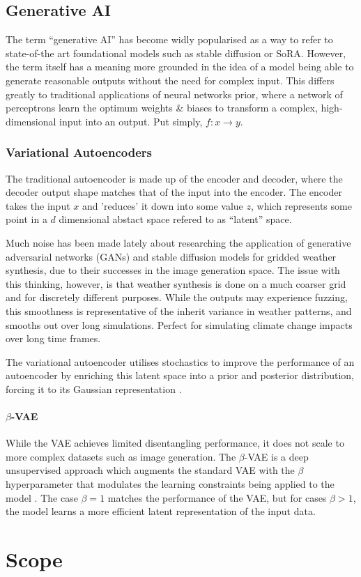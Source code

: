 \section{Generative AI}

The term ``generative AI'' has become widly popularised as a way to refer to state-of-the art 
foundational models such as stable diffusion or SoRA. However, the term itself has a meaning
more grounded in the idea of a model being able to generate reasonable outputs without the
need for complex input. This differs greatly to traditional applications of neural networks
prior, where a network of perceptrons learn the optimum weights \& biases to transform a 
complex, high-dimensional input into an output. Put simply, $f: x \rightarrow y$.

\subsection{Variational Autoencoders}

The traditional autoencoder is made up of the encoder and decoder, where the decoder output 
shape matches that of the input into the encoder. The encoder takes the input $x$ and 'reduces'
it down into some value $z$, which represents some point in a $d$ dimensional abstact space
refered to as ``latent'' space.

Much noise has been made lately about researching the application of generative adversarial
networks (GANs) and stable diffusion models for gridded weather synthesis, due to their 
successes in the image generation space. The issue with this thinking, however, is that 
weather synthesis is done on a much coarser grid and for discretely different purposes.
While the outputs may experience fuzzing, this smoothness is representative of the inherit
variance in weather patterns, and smooths out over long simulations. Perfect for simulating
climate change impacts over long time frames.

The variational autoencoder utilises stochastics to improve the performance of an 
autoencoder by enriching this latent space into a prior and posterior distribution, forcing
it to its Gaussian representation \cite{vae}.

\subsubsection{$\beta$-VAE}

While the VAE achieves limited disentangling performance, it does not scale to more complex
datasets such as image generation. The $\beta$-VAE is a deep unsupervised approach which
augments the standard VAE with the $\beta$ hyperparameter that modulates the learning 
constraints being applied to the model \cite{beta-vae}. The case $\beta=1$ matches the 
performance of the VAE, but for cases $\beta>1$, the model learns a more efficient latent 
representation of the input data. 

\chapter{Scope} \label{Section:Scope}
